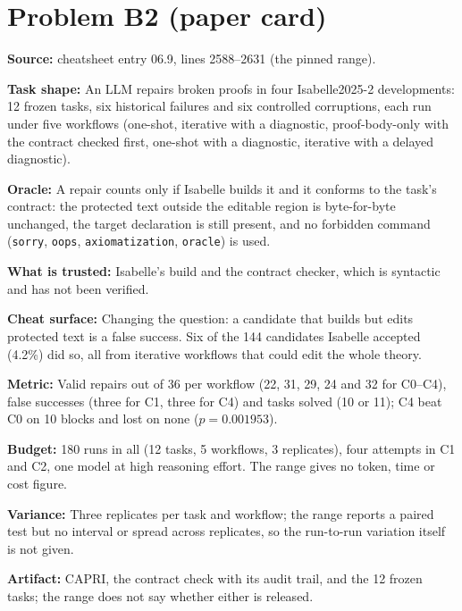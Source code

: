 \documentclass[11pt]{article}
\begin{document}
\section*{Problem B2 (paper card)}\label{ans:B2}
\begin{answer}
\textbf{Source:} cheatsheet entry 06.9, lines 2588--2631 (the pinned range).

\textbf{Task shape:} An LLM repairs broken proofs in four Isabelle2025-2
developments: 12 frozen tasks, six historical failures and six controlled
corruptions, each run under five workflows (one-shot, iterative with a
diagnostic, proof-body-only with the contract checked first, one-shot with a
diagnostic, iterative with a delayed diagnostic).

\textbf{Oracle:} A repair counts only if Isabelle builds it and it conforms to
the task's contract: the protected text outside the editable region is
byte-for-byte unchanged, the target declaration is still present, and no
forbidden command (\texttt{sorry}, \texttt{oops}, \texttt{axiomatization},
\texttt{oracle}) is used.

\textbf{What is trusted:} Isabelle's build and the contract checker, which is
syntactic and has not been verified.

\textbf{Cheat surface:} Changing the question: a candidate that builds but
edits protected text is a false success. Six of the 144 candidates Isabelle
accepted (4.2\%) did so, all from iterative workflows that could edit the whole
theory.

\textbf{Metric:} Valid repairs out of 36 per workflow (22, 31, 29, 24 and 32
for C0--C4), false successes (three for C1, three for C4) and tasks solved (10
or 11); C4 beat C0 on 10 blocks and lost on none ($p = 0.001953$).

\textbf{Budget:} 180 runs in all (12 tasks, 5 workflows, 3 replicates), four
attempts in C1 and C2, one model at high reasoning effort. The
range gives no token, time or cost figure.

\textbf{Variance:} Three replicates per task and workflow; the range reports a
paired test but no interval or spread across replicates, so the run-to-run
variation itself is not given.

\textbf{Artifact:} CAPRI, the contract check with its audit trail, and the 12
frozen tasks; the range does not say whether either is released.
\end{answer}
\end{document}
